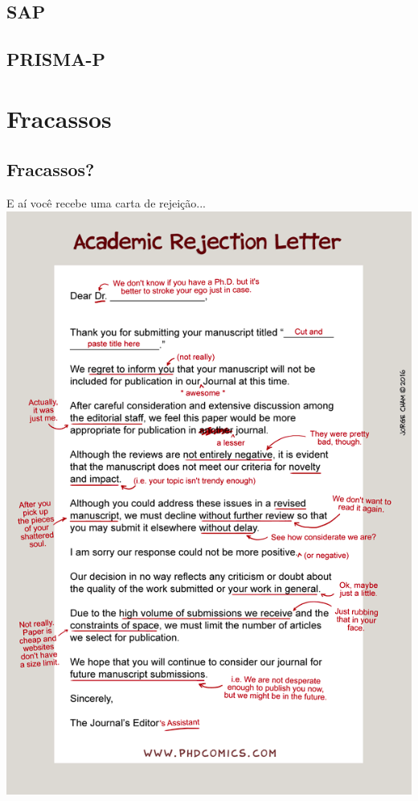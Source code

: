\documentclass{beamer}
\begin{document}
\subsection{SAP}

\subsection{PRISMA-P}

\section{Fracassos}

\subsection{Fracassos?}

\begin{frame}{E aí você recebe uma carta de rejeição...}
  \centering
  \includegraphics[height=\textheight]{Etapas/phd071316s}
\end{frame}
\end{document}
